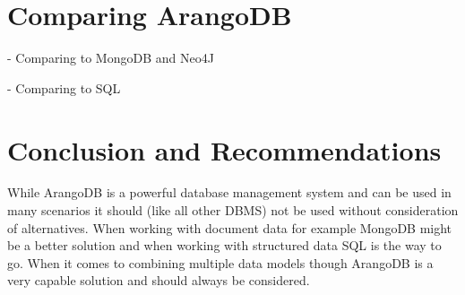 \section{Comparing ArangoDB}
- Comparing to MongoDB and Neo4J

- Comparing to SQL

\section{Conclusion and Recommendations}
While ArangoDB is a powerful database management system and can be used in many scenarios it should (like all other DBMS) not be used without consideration of alternatives. When working with document data for example MongoDB might be a better solution and when working with structured data SQL is the way to go. When it comes to combining multiple data models though ArangoDB is a very capable solution and should always be considered.
